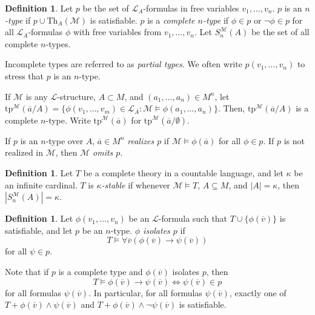 \documentclass{amsart}
\theoremstyle{definition}
\newtheorem{definition}[theorem]{Definition}
\numberwithin{equation}{section}
\begin{document}
\begin{definition}
	Let $p$ be the set of $\mathcal{L}_A$-formulas in free variables $v_1,\dots,v_n$.
	$p$ is an \emph{$n$-type} if $p\cup \mathrm{Th}_A(\mathcal{M})$ is satisfiable.
	$p$ is a \emph{complete $n$-type} if $\phi\in p$ or $\neg\phi\in p$ for all $\mathcal{L}_A$-formulas $\phi$ with free variables from $v_1,\dots,v_n$.
	Let $S^{\mathcal{M}}_n(A)$ be the set of all complete $n$-types.

	Incomplete types are referred to as \emph{partial types}.
	We often write $p(v_1,\dots,v_n)$ to stress that $p$ is an $n$-type.

	If $\mathcal{M}$ is any $\mathcal{L}$-structure,
	$A \subset M$, and $(a_1,\dots,a_n)\in M^n$,
	let $\mathrm{tp}^{\mathcal{M}}(\overline{a}/A) = \{\phi(v_1,\dots,v_m)\in \mathcal{L}_A:\mathcal{M}\models \phi(a_1,\dots,a_n)\}$.
	Then, $\mathrm{tp}^{\mathcal{M}}(\overline{a}/A)$ is a complete $n$-type.
	Write $\mathrm{tp}^{\mathcal{M}}(\overline{a})$ for $\mathrm{tp}^{\mathcal{M}}(\overline{a}/\emptyset)$.

	If $p$ is an $n$-type over $A$,
	$\overline{a}\in M^n$ \emph{realizes $p$} if $\mathcal{M} \models \phi(\overline{a})$ for all $\phi\in p$.
	If $p$ is not realized in $\mathcal{M}$,
	then $\mathcal{M}$ \emph{omits $p$}.
\end{definition}

\begin{definition}
	Let $T$ be a complete theory in a countable language,
	and let $\kappa$ be an infinite cardinal.
	$T$ is \emph{$\kappa$-stable} if whenever $\mathcal{M}\models T$,
	$A \subseteq M$, and $|A| = \kappa$, then $|S^{\mathcal{M}}_n(A)| = \kappa$.
\end{definition}

\begin{definition}
	Let $\phi(v_1,\dots,v_n)$ be an $\mathcal{L}$-formula such that $T \cup \{\phi(\overline{v})\}$ is satisfiable,
	and let $p$ be an $n$-type.
	\emph{$\phi$ isolates $p$} if
	\[
		T \models \forall\overline{v}(\phi(\overline{v}) \to \psi(\overline{v}))
	\]
	for all $\psi \in p$.
\end{definition}
Note that if $p$ is a complete type and $\phi(\overline{v})$ isolates $p$, then
\[
	T \models \phi(\overline{v}) \to \psi(\overline{{v}}) \iff \psi(\overline{v})\in p
\]
for all formulas $\psi(\overline{v})$.
In particular, for all formulas $\psi(\overline{v})$,
exactly one of $T + \phi(\overline{v}) \land \psi(\overline{v})$ and $T + \phi(\overline{v}) \land \neg\psi(\overline{v})$ is satisfiable.
\end{document}
